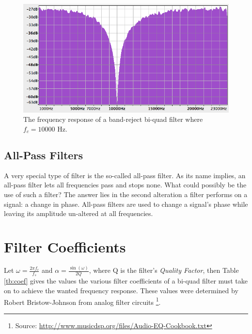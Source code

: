 \begin{figure}[p!]
  \includegraphics[scale=0.6]{img/bandreject}
  \caption{The frequency response of a band-reject bi-quad filter where $f_{c} = 10000$ Hz.}
  \label{fig:bandreject}
\end{figure}

\pagebreak

\subsection{All-Pass Filters}

A very special type of filter is the so-called all-pass filter. As its name implies, an all-pass filter lets all frequencies pass and stops none. What could possibly be the use of such a filter? The answer lies in the second alteration a filter performs on a signal: a change in phase. All-pass filters are used to change a signal's phase while leaving its amplitude un-altered at all frequencies.

\section{Filter Coefficients}

Let $\omega = \frac{2\pi f_{c}}{f_{s}}$ and $\alpha = \frac{\sin(\omega)}{2Q}$, where Q is the filter's \emph{Quality Factor}\footnotemark{}, then Table \ref{tb:coef} gives the values the various filter coefficients of a bi-quad filter must take on to achieve the wanted frequency response. These values were determined by Robert Bristow-Johnson from analog filter circuits \footnote{Source: \url{http://www.musicdsp.org/files/Audio-EQ-Cookbook.txt}}.


